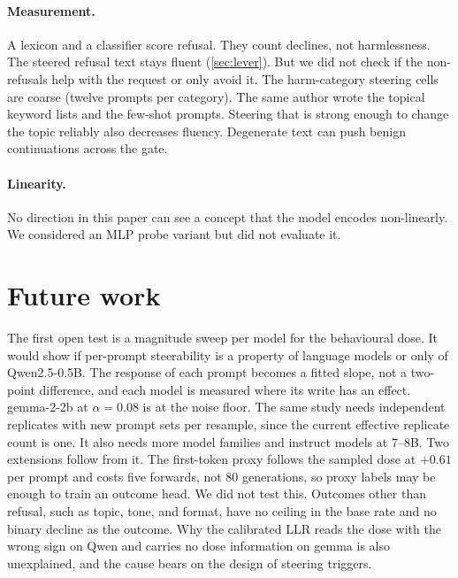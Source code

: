 \documentclass[11pt]{article}
\begin{document}
\paragraph{Measurement.} A lexicon and a classifier score refusal. They count declines, not harmlessness.
The steered refusal text stays fluent (\cref{sec:lever}). But we did not check if the non-refusals help
with the request or only avoid it.
The harm-category steering cells are coarse (twelve prompts per category). The same author wrote the topical
keyword lists and the few-shot prompts. Steering that is strong enough to change the topic reliably also
decreases fluency. Degenerate text can push benign continuations across the gate.

\paragraph{Linearity.} No direction in this paper can see a concept that the model encodes non-linearly. We
considered an MLP probe variant but did not evaluate it.

\section{Future work}
\label{sec:future}

The first open test is a magnitude sweep per model for the behavioural dose. It would show if per-prompt
steerability is a property of language models or only of Qwen2.5-0.5B. The response of each prompt becomes
a fitted slope, not a two-point difference, and each model is measured where its write has an effect.
gemma-2-2b at $\alpha=0.08$ is at the noise floor. The same study needs independent replicates with new
prompt sets per resample, since the current effective replicate count is one. It also needs more model
families and instruct models at 7--8B. Two extensions follow from it. The first-token proxy follows the
sampled dose at $+0.61$ per prompt and costs five forwards, not 80 generations, so proxy labels may be
enough to train an outcome head. We did not test this. Outcomes other than refusal, such as topic, tone, and format, have no ceiling in
the base rate and no binary decline as the outcome. Why the calibrated LLR reads the dose with the wrong
sign on Qwen and carries no dose information on gemma is also unexplained, and the cause bears on the design
of steering triggers.
\end{document}
